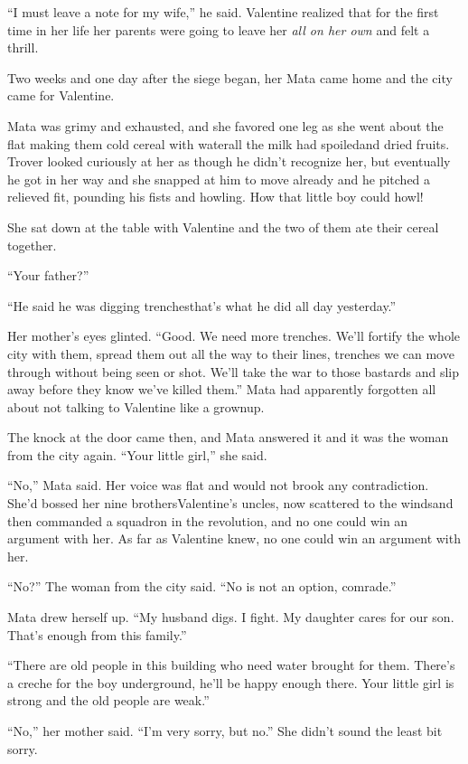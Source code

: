 “I must leave a note for my wife,” he said. Valentine realized that
for the first time in her life her parents were going to leave her
\emph{all on her own} and felt a thrill.

\tb

Two weeks and one day after the siege began, her Mata came home and
the city came for Valentine.

Mata was grimy and exhausted, and she favored one leg as she went
about the flat making them cold cereal with water\dash{}all the milk had
spoiled\dash{}and dried fruits. Trover looked curiously at her as though
he didn’t recognize her, but eventually he got in her way and she
snapped at him to move already and he pitched a relieved fit,
pounding his fists and howling. How that little boy could howl!

She sat down at the table with Valentine and the two of them ate
their cereal together.

“Your father?”

“He said he was digging trenches\dash{}that’s what he did all day
yesterday.”

Her mother’s eyes glinted. “Good. We need more trenches. We’ll
fortify the whole city with them, spread them out all the way to
their lines, trenches we can move through without being seen or
shot. We’ll take the war to those bastards and slip away before
they know we’ve killed them.” Mata had apparently forgotten all
about not talking to Valentine like a grownup.

The knock at the door came then, and Mata answered it and it was
the woman from the city again. “Your little girl,” she said.

“No,” Mata said. Her voice was flat and would not brook any
contradiction. She’d bossed her nine brothers\dash{}Va\-len\-tine’s uncles,
now scattered to the winds\dash{}and then commanded a squadron in the
revolution, and no one could win an argument with her. As far as
Valentine knew, no one could win an argument with her.

“No?” The woman from the city said. “No is not an option,
comrade.”

Mata drew herself up. “My husband digs. I fight. My daughter cares
for our son. That’s enough from this family.”

“There are old people in this building who need water brought for
them. There’s a creche for the boy underground, he’ll be happy
enough there. Your little girl is strong and the old people are
weak.”

“No,” her mother said. “I’m very sorry, but no.” She didn’t sound
the least bit sorry.

